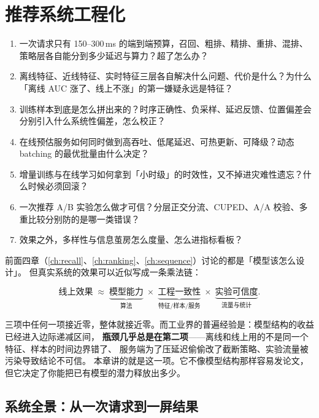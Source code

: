 \chapter{推荐系统工程化}
\label{ch:receng}

\begin{insight}[本章要解决的问题]
\begin{enumerate}
  \item 一次请求只有 150--300\,ms 的端到端预算，召回、粗排、精排、重排、混排、策略层各自能分到多少延迟与算力？超了怎么办？
  \item 离线特征、近线特征、实时特征三层各自解决什么问题、代价是什么？为什么「离线 AUC 涨了、线上不涨」的第一嫌疑永远是特征？
  \item 训练样本到底是怎么拼出来的？时序正确性、负采样、延迟反馈、位置偏差会分别引入什么系统性偏差，怎么校正？
  \item 在线预估服务如何同时做到高吞吐、低尾延迟、可热更新、可降级？动态 batching 的最优批量由什么决定？
  \item 增量训练与在线学习如何拿到「小时级」的时效性，又不掉进灾难性遗忘？什么时候必须回滚？
  \item 一次推荐 A/B 实验怎么做才可信？分层正交分流、CUPED、A/A 校验、多重比较分别防的是哪一类错误？
  \item 效果之外，多样性与信息茧房怎么度量、怎么进指标看板？
\end{enumerate}
\end{insight}

前面四章（\cref{ch:recall}、\cref{ch:ranking}、\cref{ch:sequence}）讨论的都是「模型该怎么设计」。
但真实系统的效果可以近似写成一条乘法链：

\begin{equation}
\text{线上效果} \;\approx\; \underbrace{\text{模型能力}}_{\text{算法}} \;\times\; \underbrace{\text{工程一致性}}_{\text{特征/样本/服务}} \;\times\; \underbrace{\text{实验可信度}}_{\text{流量与统计}} .
\label{eq:effect-product}
\end{equation}

三项中任何一项接近零，整体就接近零。而工业界的普遍经验是：模型结构的收益已经进入边际递减区间，
\textbf{瓶颈几乎总是在第二项}——离线和线上用的不是同一个特征、样本的时间边界错了、
服务端为了压延迟偷偷改了截断策略、实验流量被污染导致结论不可信。
本章讲的就是这一项。它不像模型结构那样容易发论文，但它决定了你能把已有模型的潜力释放出多少。

\section{系统全景：从一次请求到一屏结果}

